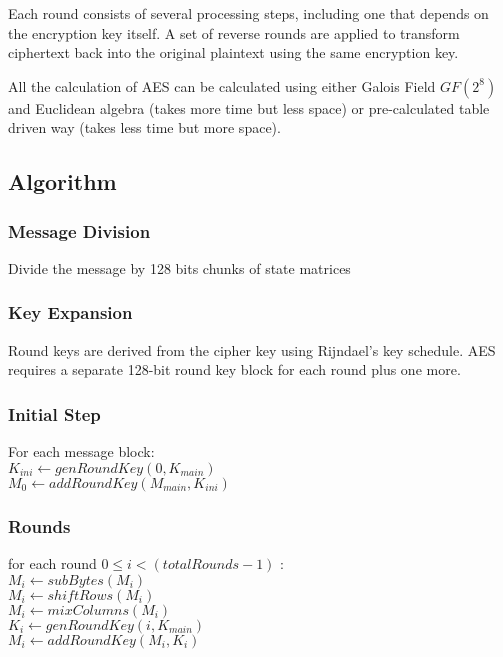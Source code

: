 Each round consists of several processing steps, including one that depends on the encryption key itself. A set of reverse rounds are applied to transform ciphertext back into the original plaintext using the same encryption key.

All the calculation of AES can be calculated using either Galois Field $GF(2^8)$ and Euclidean algebra (takes more time but less space) or pre-calculated table driven way (takes less time but more space).

\subsection{Algorithm}
\subsubsection{Message Division}
Divide the message by 128 bits chunks of state matrices

\subsubsection{Key Expansion}
Round keys are derived from the cipher key using Rijndael's key schedule. AES requires a separate 128-bit round key block for each round plus one more.

\subsubsection{Initial Step}
For each message block: \\
\algoTab $ K_{ini} \gets genRoundKey(0, K_{main}) $ \\
\algoTab $ M_0 \gets addRoundKey(M_{main}, K_{ini}) $ \\

\subsubsection{Rounds}
\algoTab for each round $ 0 \leq i < (totalRounds - 1) $ :\\
\algoTab \algoTab $ M_i \gets subBytes(M_i) $ \\
\algoTab \algoTab $ M_i \gets shiftRows(M_i) $ \\
\algoTab \algoTab $ M_i \gets mixColumns(M_i) $ \\
\algoTab \algoTab $ K_i \gets genRoundKey(i, K_{main}) $ \\
\algoTab \algoTab $ M_i \gets addRoundKey(M_i, K_i) $ \\

